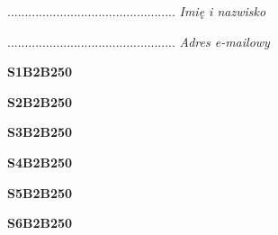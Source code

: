 \begin{turn}{90}\begin{minipage}{\linewidth} \vspace{20mm} ................................................  \textit{Imię i nazwisko}\end{minipage}\end{turn}

\begin{turn}{90}\begin{minipage}{\linewidth} \vspace{20mm} ................................................  \textit{Adres e-mailowy}\end{minipage}\end{turn}

\begin{turn}{90}\huge \begin{minipage}{\linewidth} \vspace{10mm}\textbf{S1B2B250}\end{minipage}\end{turn}

\begin{turn}{90}\huge \begin{minipage}{\linewidth} \vspace{10mm}\textbf{S2B2B250}\end{minipage}\end{turn}

\begin{turn}{90}\huge \begin{minipage}{\linewidth} \vspace{10mm}\textbf{S3B2B250}\end{minipage}\end{turn}

\begin{turn}{90}\huge \begin{minipage}{\linewidth} \vspace{10mm}\textbf{S4B2B250}\end{minipage}\end{turn}

\begin{turn}{90}\huge \begin{minipage}{\linewidth} \vspace{10mm}\textbf{S5B2B250}\end{minipage}\end{turn}

\begin{turn}{90}\huge \begin{minipage}{\linewidth} \vspace{10mm}\textbf{S6B2B250}\end{minipage}\end{turn}

